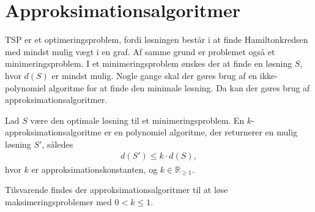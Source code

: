 \section{Approksimationsalgoritmer}
TSP er et optimeringsproblem, fordi løsningen består i at finde Hamiltonkredsen med mindst mulig vægt i en graf. 
Af samme grund er problemet også et minimeringsproblem. 
I et minimeringsproblem ønskes der at finde en løsning $S$, hvor $d(S)$ er mindst mulig.
Nogle gange skal der gøres brug af en ikke-polynomiel algoritme for at finde den minimale løsning.
Da kan der gøres brug af approksimationsalgoritmer.

\begin{defn}\label{def:apk}
Lad $S$ være den optimale løsning til et minimeringsproblem. En $k$-approksimationsalgoritme er en polynomiel algoritme, der returnerer en mulig løsning $S'$, således
\begin{align*}
d(S') \leq k \cdot d(S),
\end{align*}
hvor $k$ er approksimationskonstanten, og $k \in \mathbb{R}_{\geq 1}$.
\end{defn}

Tilsvarende findes der approksimationsalgoritmer til at løse maksimeringsproblemer med $0 < k \leq 1$. \citep{approksalg}
